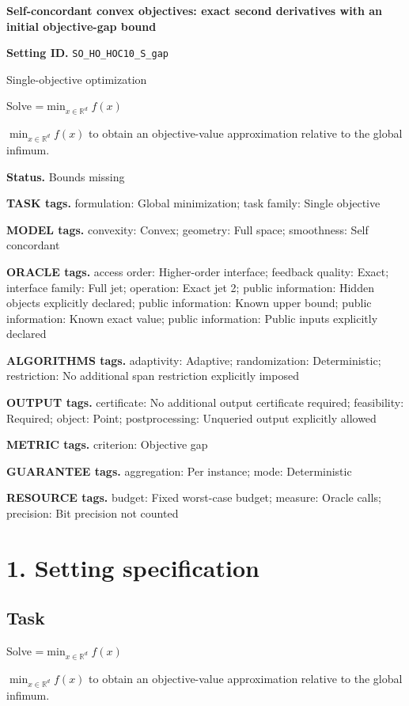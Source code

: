 \documentclass[10pt,a4paper]{article}
\newcommand{\AtlasMath}[1]{\par\begingroup\centering\setbox0=\hbox{$\displaystyle #1$}\ifdim\wd0>1.4\linewidth\typeout{ATLAS WIDE FORMULA: \the\wd0}\fi\ifdim\wd0>\linewidth\resizebox{\linewidth}{!}{\box0}\else\box0\fi\par\endgroup}
\newcommand{\AtlasInlineMath}[1]{\begingroup\setbox0=\hbox{$#1$}\ifdim\wd0>.4\linewidth\endgroup\AtlasMath{#1}\else\endgroup$#1$\fi}
\begin{document}
\raggedright

{\LARGE\bfseries\sffamily\color{AtlasNavy} Self-concordant convex objectives: exact second derivatives with an initial objective-gap bound\par}\vspace{5pt}
\textbf{Setting ID.} \texttt{SO\_\allowbreak{}HO\_\allowbreak{}HOC10\_\allowbreak{}S\_\allowbreak{}gap}

Single-objective optimization

Solve \AtlasInlineMath{\min_{x\in \mathbb{R}^d}f(x)} to obtain an objective-value approximation relative to the global infimum.

\textbf{Status.} Bounds missing

\textbf{TASK tags.} formulation: Global minimization; task family: Single objective

\textbf{MODEL tags.} convexity: Convex; geometry: Full space; smoothness: Self concordant

\textbf{ORACLE tags.} access order: Higher-order interface; feedback quality: Exact; interface family: Full jet; operation: Exact jet 2; public information: Hidden objects explicitly declared; public information: Known upper bound; public information: Known exact value; public information: Public inputs explicitly declared

\textbf{ALGORITHMS tags.} adaptivity: Adaptive; randomization: Deterministic; restriction: No additional span restriction explicitly imposed

\textbf{OUTPUT tags.} certificate: No additional output certificate required; feasibility: Required; object: Point; postprocessing: Unqueried output explicitly allowed

\textbf{METRIC tags.} criterion: Objective gap

\textbf{GUARANTEE tags.} aggregation: Per instance; mode: Deterministic

\textbf{RESOURCE tags.} budget: Fixed worst-case budget; measure: Oracle calls; precision: Bit precision not counted

\section{1. Setting specification}
\subsection{Task}
Solve \AtlasInlineMath{\min_{x\in \mathbb{R}^d}f(x)} to obtain an objective-value approximation relative to the global infimum.
\end{document}
